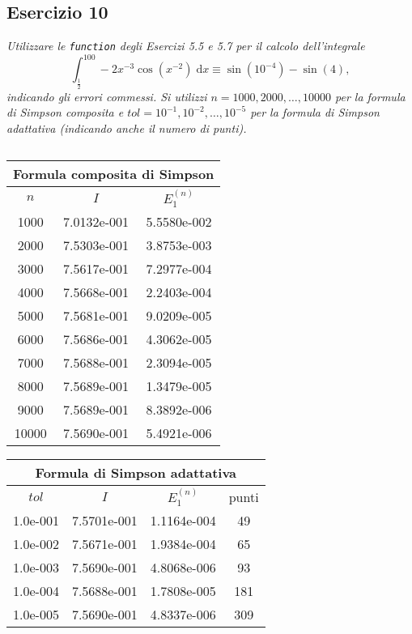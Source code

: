 \subsection{Esercizio 10}
\label{sub:es10}
\emph{Utilizzare le \lstinline{function} degli Esercizi 5.5 e 5.7 per il calcolo dell'integrale
      $$\int_{\frac{1}{2}}^{100}-2x^{-3}\cos\left(x^{-2}\right)\;\mathrm{d}x\equiv\sin\left(10^{-4}\right)-\sin(4),$$
			indicando gli errori commessi.
      Si utilizzi $n=1000,2000,\dots,10000$ per la formula di Simpson composita e
      $tol=10^{-1},10^{-2},\dots,10^{-5}$ per la formula di Simpson adattativa (indicando anche il numero di punti).}
\begin{sol}
	
	\normalfont
	$ $\\
	\begin{center}\begin{tabular}{c|c|c}
	\hline\multicolumn{3}{c}{Formula composita di Simpson}\\\hline
	$n$ & $I$ & $E_1^{(n)}$\\\hline
	1000 	  &7.0132e-001 	  &5.5580e-002\\
	2000 	  &7.5303e-001 	  &3.8753e-003\\
	3000 	  &7.5617e-001 	  &7.2977e-004\\
	4000 	  &7.5668e-001 	  &2.2403e-004\\
	5000 	  &7.5681e-001 	  &9.0209e-005\\
	6000 	  &7.5686e-001 	  &4.3062e-005\\
	7000 	  &7.5688e-001 	  &2.3094e-005\\
	8000 	  &7.5689e-001 	  &1.3479e-005\\
	9000 	  &7.5689e-001 	  &8.3892e-006\\
	10000 	  &7.5690e-001 	  &5.4921e-006
	\end{tabular}\end{center}\begin{center}
	\begin{tabular}{c|c|c|c}
	\hline\multicolumn{4}{c}{Formula di Simpson adattativa}\\\hline
	$tol$ & $I$ & $E_1^{(n)}$ & punti\\\hline
	1.0e-001 	  &7.5701e-001 	  &1.1164e-004 	  &49\\
	1.0e-002 	  &7.5671e-001 	  &1.9384e-004 	  &65\\
	1.0e-003 	  &7.5690e-001 	  &4.8068e-006 	  &93\\
	1.0e-004 	  &7.5688e-001 	  &1.7808e-005 	  &181\\
	1.0e-005 	  &7.5690e-001 	  &4.8337e-006 	  &309
	\end{tabular}\end{center}
\end{sol}
